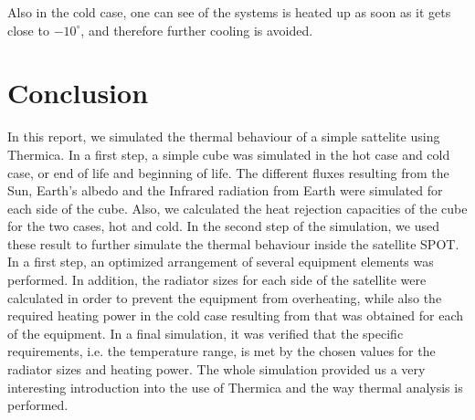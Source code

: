 Also in the cold case, one can see of the systems is heated up as soon as it gets close to $-10^{\circ}$, and therefore further cooling is avoided.

\section{Conclusion}
In this report, we simulated the thermal behaviour of a simple sattelite using Thermica. In a first step, a simple cube was simulated in the hot case and cold case, or end of life and beginning of life. The different fluxes resulting from the Sun, Earth's albedo and the Infrared radiation from Earth were simulated for each side of the cube. Also, we calculated the heat rejection capacities of the cube for the two cases, hot and cold.
In the second step of the simulation, we used these result to further simulate the thermal behaviour inside the satellite SPOT. In a first step, an optimized arrangement of several equipment elements was performed. In addition, the radiator sizes for each side of the satellite were calculated in order to prevent the equipment from overheating, while also the required heating power in the cold case resulting from that was obtained for each of the equipment. In a final simulation, it was verified that the specific requirements, i.e. the temperature range, is met by the chosen values for the radiator sizes and heating power. The whole simulation provided us a very interesting introduction into the use of Thermica and the way thermal analysis is performed.
